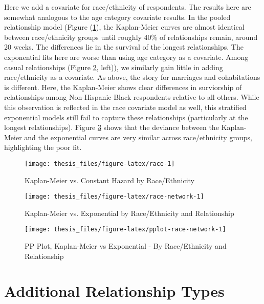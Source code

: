 \documentclass [11pt, proquest] {uwthesis}[2015/03/03]
\begin{document}
Here we add a covariate for race/ethnicity of respondents. The results here are somewhat analogous to the age category covariate results. In the pooled relationship model (Figure (\ref{fig:race}), the Kaplan-Meier curves are almost identical between race/ethnicity groups until roughly 40\% of relationships remain, around 20 weeks. The differences lie in the survival of the longest relationships. The exponential fits here are worse than using age category as a covariate. Among casual relationships (Figure \ref{fig:race-network}, left)), we similarly gain little in adding race/ethnicity as a covariate. As above, the story for marriages and cohabitations is different. Here, the Kaplan-Meier shows clear differences in surviorship of relationships among Non-Hispanic Black respondents relative to all others. While this observation is reflected in the race covariate model as well, this stratified exponential models still fail to capture these relationships (particularly at the longest relationships). Figure \ref{fig:pplot-race-network} shows that the deviance between the Kaplan-Meier and the exponential curves are very similar across race/ethnicity groups, highlighting the poor fit.
\begin{figure}

{\centering \texttt{[image: thesis\_files/figure-latex/race-1]} 

}

\caption{Kaplan-Meier vs. Constant Hazard by Race/Ethnicity}\label{fig:race}
\end{figure}
\begin{figure}

{\centering \texttt{[image: thesis\_files/figure-latex/race-network-1]} 

}

\caption{Kaplan-Meier vs. Exponential by Race/Ethnicity and Relationship}\label{fig:race-network}
\end{figure}
\begin{figure}

{\centering \texttt{[image: thesis\_files/figure-latex/pplot-race-network-1]} 

}

\caption{PP Plot, Kaplan-Meier vs Exponential - By Race/Ethnicity and Relationship}\label{fig:pplot-race-network}
\end{figure}
\hypertarget{additional-relationship-types}{%
\section{Additional Relationship Types}\label{additional-relationship-types}}
\end{document}
